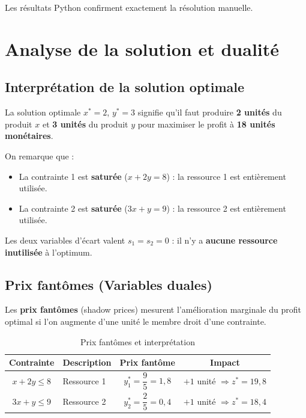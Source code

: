 \documentclass[12pt,a4paper]{article}
\begin{document}
Les résultats Python confirment exactement la résolution manuelle.

\section{Analyse de la solution et dualité}

\subsection{Interprétation de la solution optimale}

La solution optimale $x^* = 2$, $y^* = 3$ signifie qu'il faut 
produire \textbf{2 unités} du produit $x$ et \textbf{3 unités} du 
produit $y$ pour maximiser le profit à \textbf{18 unités monétaires}.

On remarque que :
\begin{itemize}[noitemsep]
  \item La contrainte 1 est \textbf{saturée} ($x + 2y = 8$) : 
  la ressource 1 est entièrement utilisée.
  \item La contrainte 2 est \textbf{saturée} ($3x + y = 9$) : 
  la ressource 2 est entièrement utilisée.
\end{itemize}

Les deux variables d'écart valent $s_1 = s_2 = 0$ : il n'y a 
\textbf{aucune ressource inutilisée} à l'optimum.

\subsection{Prix fantômes (Variables duales)}

Les \textbf{prix fantômes} (shadow prices) mesurent l'amélioration 
marginale du profit optimal si l'on augmente d'une unité le 
membre droit d'une contrainte.

\begin{table}[H]
\centering
\caption{Prix fantômes et interprétation}
\begin{tabular}{clcc}
\toprule
\textbf{Contrainte} & \textbf{Description} & \textbf{Prix fantôme} & \textbf{Impact} \\
\midrule
$x + 2y \leq 8$ & Ressource 1 & $y_1^* = \dfrac{9}{5} = 1{,}8$ 
  & $+1$ unité $\Rightarrow z^* = 19{,}8$ \\[8pt]
$3x + y \leq 9$  & Ressource 2 & $y_2^* = \dfrac{2}{5} = 0{,}4$ 
  & $+1$ unité $\Rightarrow z^* = 18{,}4$ \\
\bottomrule
\end{tabular}
\end{table}
\end{document}
